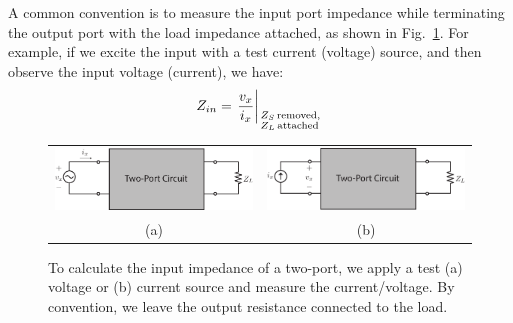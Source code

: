 A common convention is to measure the input port impedance while terminating the output port with the load impedance attached, as shown in Fig.~\ref{fig:2port_zin_vx}.  For example, if we excite the input with a test current (voltage) source, and then observe the input voltage (current), we have:
\begin{equation}
	Z_{in} = \left. \frac{v_x}
                        {i_x} 
                                         \right|_{\scriptstyle{Z_S}\,\text{removed},\hfill\atop
	\scriptstyle{Z_L}\,\text{attached}\hfill}
\end{equation}
\begin{figure}[tb]
\begin{center}
\begin{tabular}{cc}
\includegraphics[width=.5\columnwidth]{2port_zin_vx} &
\includegraphics[width=.5\columnwidth]{2port_zin_ix} \\
(a) & (b) \\
\end{tabular}
\end{center}
\caption{To calculate the input impedance of a two-port, we apply a test (a) voltage or (b) current source and measure the current/voltage.  By convention, we leave the output resistance connected to the load.}
\label{fig:2port_zin_vx}
\end{figure}
